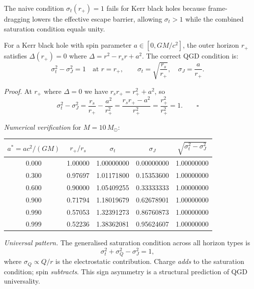 \documentclass[12pt,a4paper]{article}
\newcommand{\Msun}{M_{\odot}}
\begin{document}
The naive condition $\sigma_t(r_+)=1$ fails for Kerr black holes because
frame-dragging lowers the effective escape barrier, allowing $\sigma_t>1$
while the combined saturation condition equals unity.

\begin{result}
For a Kerr black hole with spin parameter $a\in[0,GM/c^2]$, the outer
horizon $r_+$ satisfies $\Delta(r_+)=0$ where $\Delta=r^2-r_s r+a^2$.
The correct QGD condition is:
\begin{equation}
  \boxed{\sigma_t^2 - \sigma_J^2 = 1 \quad\text{at }r = r_+,}
  \qquad
  \sigma_t = \sqrt{\frac{r_s}{r_+}},\quad
  \sigma_J = \frac{a}{r_+}.
\end{equation}
\end{result}

\noindent\textit{Proof.}
At $r_+$ where $\Delta=0$ we have $r_s r_+=r_+^2+a^2$, so
\begin{equation}
  \sigma_t^2-\sigma_J^2
  = \frac{r_s}{r_+}-\frac{a^2}{r_+^2}
  = \frac{r_s r_+-a^2}{r_+^2}
  = \frac{r_+^2}{r_+^2} = 1.\qquad\square
\end{equation}

\noindent\textit{Numerical verification} for $M=10\,\Msun$:

\begin{center}
\renewcommand{\arraystretch}{1.15}
\begin{tabular}{ccccc}
\toprule
$a^*=ac^2/(GM)$ & $r_+/r_s$ & $\sigma_t$ & $\sigma_J$ &
  $\sqrt{\sigma_t^2-\sigma_J^2}$\\
\midrule
0.000 & 1.00000 & 1.00000000 & 0.00000000 & 1.00000000\\
0.300 & 0.97697 & 1.01171800 & 0.15353600 & 1.00000000\\
0.600 & 0.90000 & 1.05409255 & 0.33333333 & 1.00000000\\
0.900 & 0.71794 & 1.18019679 & 0.62678901 & 1.00000000\\
0.990 & 0.57053 & 1.32391273 & 0.86760873 & 1.00000000\\
0.999 & 0.52236 & 1.38362081 & 0.95624607 & 1.00000000\\
\bottomrule
\end{tabular}
\end{center}

\medskip\noindent\textit{Universal pattern.}
The generalised saturation condition across all horizon types is
\begin{equation}
  \sigma_t^2 + \sigma_Q^2 - \sigma_J^2 = 1,
\end{equation}
where $\sigma_Q\propto Q/r$ is the electrostatic contribution.
Charge \textit{adds} to the saturation condition; spin \textit{subtracts}.
This sign asymmetry is a structural prediction of QGD universality.
\end{document}
